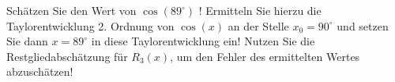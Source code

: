 \item
Schätzen Sie den Wert von $\cos(89^{\circ})$ ! Ermitteln Sie hierzu die Taylorentwicklung 2. Ordnung von $\cos(x)$ an der Stelle $x_0=90^{\circ}$ und setzen Sie dann $x = 89^{\circ}$ in diese Taylorentwicklung ein! Nutzen Sie die Restgliedabschätzung für $R_3(x)$, um den Fehler des ermittelten Wertes abzuschätzen!

